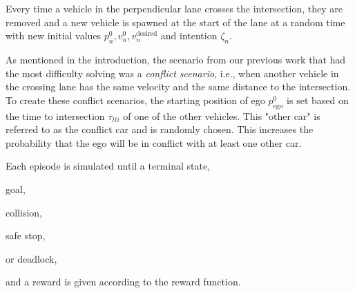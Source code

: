 Every time a vehicle in the perpendicular lane crosses the intersection, they are removed and a new vehicle is spawned at the start of the lane at a random time with new initial values $p_n^0, v_n^0, v^\mathrm{desired}_n$ and intention $\zeta_n$. 

As mentioned in the introduction, the scenario from our previous work \cite{tram2019} that had the most difficulty solving was a \textit{conflict scenario}, i.e., when another vehicle in the crossing lane has the same velocity and the same distance to the intersection. To create these conflict scenarios, the starting position of ego $p^0_\mathrm{ego}$ is set based on the time to intersection $\tau_{tti}$ of one of the other vehicles.
This "other car" is referred to as the conflict car and is randomly chosen. 
This increases the probability that the ego will be in conflict with at least one other car. 

Each episode is simulated until a terminal state, 
\begin{enumerate*}[label=(\roman*)]
  \item goal,
  \item collision, 
  \item safe stop, 
  \item or deadlock, 
\end{enumerate*} and a reward is given according to the reward function.

